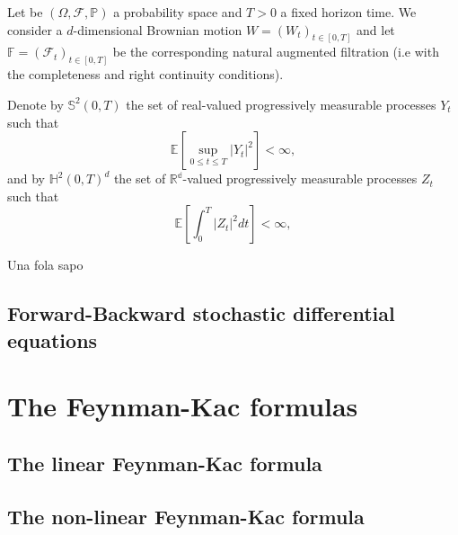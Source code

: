 Let be $(\Omega,\mathcal{F},\mathbb{P})$ a probability space and $T>0$ a fixed horizon time. We consider a $d$-dimensional Brownian motion $W=(W_t)_{t\in [0,T]}$ and let $\mathbb{F}=(\mathcal{F}_t)_{t\in[0,T]}$ be the corresponding natural augmented filtration (i.e with the completeness and right continuity conditions).

Denote by $\mathbb{S}^2(0,T)$ the set of real-valued progressively measurable processes $Y_t$ such that 
\begin{equation}
	\mathbb{E}\left[\sup_{0\leq t \leq T}|Y_t|^2\right]<\infty,
\end{equation}  
and by $\mathbb{H}^2(0,T)^d$ the set of $\mathbb{R^d}$-valued progressively measurable processes $Z_t$ such that
\begin{equation}
	\mathbb{E}\left[\int_{0}^{T}|Z_t|^2 dt\right]<\infty,
\end{equation}
\begin{definition}
	Una fola sapo
\end{definition}
\subsection{Forward-Backward stochastic differential equations}
\section{The Feynman-Kac formulas}
\subsection{The linear Feynman-Kac formula}
\subsection{The non-linear Feynman-Kac formula}

 


